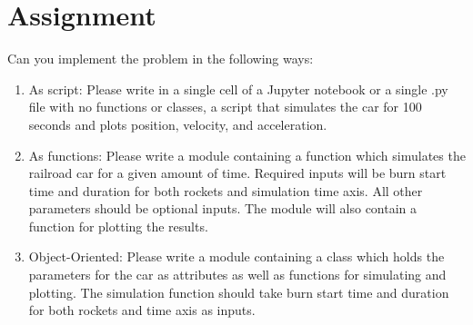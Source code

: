 \documentclass[12pt]{article}
\begin{document}
\section*{Assignment}

Can you implement the problem in the following ways:

\begin{enumerate}
	\item As script: Please write in a single cell of a Jupyter notebook or a single .py file with no functions or classes, a script that simulates the car for 100 seconds and plots position, velocity, and acceleration.
	\item As functions: Please write a module containing a function which simulates the railroad car for a given amount of time. Required inputs will be burn start time and duration for both rockets and simulation time axis. All other parameters should be optional inputs. The module will also contain a function for plotting the results.
	\item Object-Oriented: Please write a module containing a class which holds the parameters for the car as attributes as well as functions for simulating and plotting. The simulation function should take burn start time and duration for both rockets and time axis as inputs.
\end{enumerate} 
	
	
	
	
\end{document}
